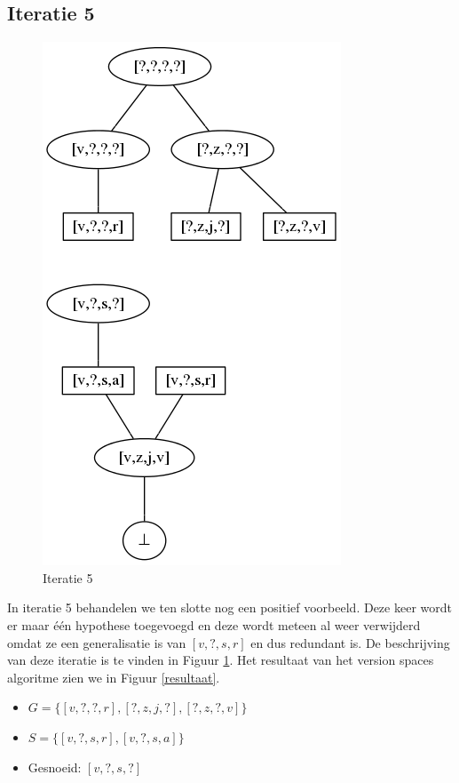 \documentclass[alternative-exam.tex]{subfiles}
\begin{document}
\subsection{Iteratie 5}
\begin{figure}
[H]
\centering
\caption{Iteratie 5}
\label{iter_5}
\includegraphics[scale=0.5]{resources/graphs/iteration_5.png}
\end{figure}
In iteratie 5 behandelen we ten slotte nog een positief voorbeeld. Deze keer wordt er maar \'e\'en hypothese toegevoegd en deze wordt meteen al weer verwijderd omdat ze een generalisatie is van $[v,?,s,r]$ en dus redundant is. De beschrijving van deze iteratie is te vinden in Figuur \ref{iter_5}. Het resultaat van het version spaces algoritme zien we in Figuur \ref{resultaat}.
\begin{itemize}
\item $G = \{[v,?,?,r],[?,z,j,?],[?,z,?,v]\}$
\item $S = \{[v,?,s,r],[v,?,s,a]\}$
\item Gesnoeid: $[v,?,s,?]$
\end{itemize}
\end{document}
